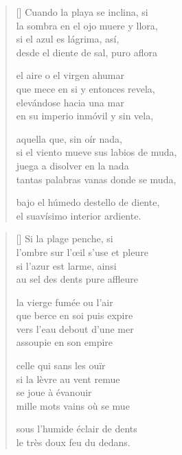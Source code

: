 



\settowidth{\versewidth}{Si el viento mueve su labio de muda}

\bigskip

\begin{verse}[\versewidth]
  Cuando la playa se inclina, si \\
  la sombra en el ojo muere y llora, \\
  si el azul es lágrima, así, \\
  desde el diente de sal, puro aflora

  el aire o el virgen ahumar \\
  que mece en si y entonces revela, \\
  elevándose hacia una mar \\
  en su imperio inmóvil y sin vela,

  aquella que, sin oír nada, \\
  si el viento mueve sus labios de muda, \\
  juega a disolver en la nada \\
  tantas palabras vanas donde se muda,

  bajo el húmedo destello de diente, \\
  el suavísimo interior ardiente.
\end{verse}

\newpage



\settowidth{\versewidth}{L'ombre sur l'œil s'use et pleure}

\bigskip

{\itshape
\begin{verse}[\versewidth]
  Si la plage penche, si \\
  l'ombre sur l'œil s'use et pleure \\
  si l'azur est larme, ainsi \\
  au sel des dents pure affleure

  la vierge fumée ou l'air \\
  que berce en soi puis expire \\
  vers l'eau debout d'une mer \\
  assoupie en son empire

  celle qui sans les ouïr \\
  si la lèvre au vent remue \\
  se joue à évanouir \\
  mille mots vains où se mue

  sous l'humide éclair de dents \\
  le très doux feu du dedans.
\end{verse}
}
